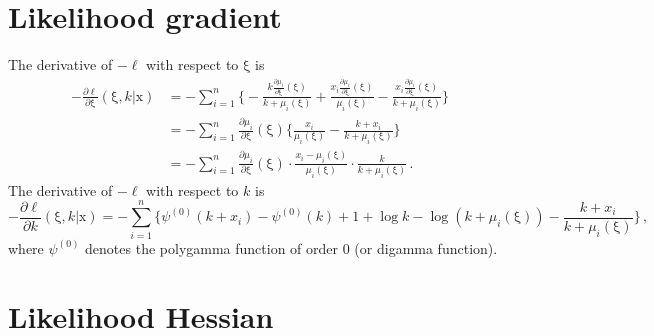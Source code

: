 \documentclass[12pt]{article}
\renewcommand{\vec}[1]{\bm{\mathrm{#1}}}
\begin{document}
\section{Likelihood gradient}

The derivative of $-\ell$ with respect to $\vec{\xi}$ is
%
\begin{equation}
  \begin{aligned}
    -\frac{\partial \ell}{\partial \vec{\xi}}(\vec{\xi},k|\vec{x})
    &= -\sum_{i=1}^{n} \bigg\{ -\frac{k \frac{\partial \mu_i}{\partial \vec{\xi}}(\vec{\xi})}{k + \mu_i(\vec{\xi})} + \frac{x_i \frac{\partial \mu_i}{\partial \vec{\xi}}(\vec{\xi})}{\mu_i(\vec{\xi})} - \frac{x_i \frac{\partial \mu_i}{\partial \vec{\xi}}(\vec{\xi})}{k + \mu_i(\vec{\xi})} \bigg\} \\
    &= -\sum_{i=1}^{n} \frac{\partial \mu_i}{\partial \vec{\xi}}(\vec{\xi}) \bigg\{\frac{x_i}{\mu_i(\vec{\xi})} - \frac{k + x_i}{k + \mu_i(\vec{\xi})} \bigg\} \\
    &= -\sum_{i=1}^{n}\frac{\partial \mu_i}{\partial \vec{\xi}}(\vec{\xi})\cdot\frac{x_i - \mu_i(\vec{\xi})}{\mu_i(\vec{\xi})}\cdot\frac{k}{k + \mu_i(\vec{\xi})}\,.
  \end{aligned}
\end{equation}
%
The derivative of $-\ell$ with respect to $k$ is
%
\begin{equation}
  -\frac{\partial \ell}{\partial k}(\vec{\xi},k|\vec{x})
  = -\sum_{i=1}^{n} \bigg\{ \psi^{(0)}(k + x_i) - \psi^{(0)}(k) + 1 + \log k - \log (k + \mu_i(\vec{\xi})) - \frac{k + x_i}{k + \mu_i(\vec{\xi})} \bigg\}\,,
\end{equation}
%
where $\psi^{(0)}$ denotes the polygamma function of order 0
(or digamma function).

\section{Likelihood Hessian}
\end{document}
